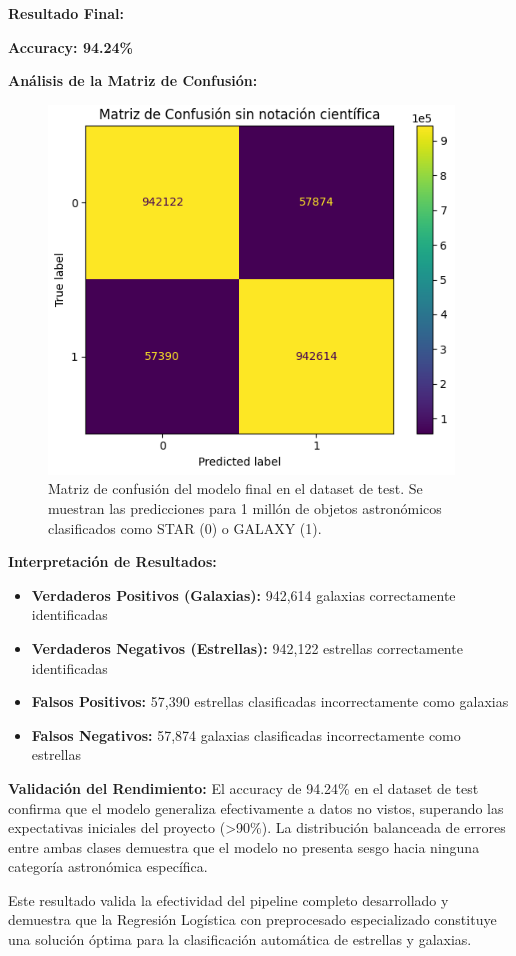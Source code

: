 \documentclass{article}
\begin{document}
\textbf{Resultado Final:}
\begin{center}
\Large \textbf{Accuracy: 94.24\%}
\end{center}

\textbf{Análisis de la Matriz de Confusión:}

\begin{figure}[H]
    \centering
    \includegraphics[width=0.6\linewidth]{matriz_confusion.png}
    \caption{Matriz de confusión del modelo final en el dataset de test. Se muestran las predicciones para 1 millón de objetos astronómicos clasificados como STAR (0) o GALAXY (1).}
    \label{fig:matriz_confusion}
\end{figure}

\textbf{Interpretación de Resultados:}
\begin{itemize}
    \item \textbf{Verdaderos Positivos (Galaxias):} 942,614 galaxias correctamente identificadas
    \item \textbf{Verdaderos Negativos (Estrellas):} 942,122 estrellas correctamente identificadas  
    \item \textbf{Falsos Positivos:} 57,390 estrellas clasificadas incorrectamente como galaxias
    \item \textbf{Falsos Negativos:} 57,874 galaxias clasificadas incorrectamente como estrellas
\end{itemize}

\textbf{Validación del Rendimiento:}
El accuracy de 94.24\% en el dataset de test confirma que el modelo generaliza efectivamente a datos no vistos, superando las expectativas iniciales del proyecto (>90\%). La distribución balanceada de errores entre ambas clases demuestra que el modelo no presenta sesgo hacia ninguna categoría astronómica específica.

Este resultado valida la efectividad del pipeline completo desarrollado y demuestra que la Regresión Logística con preprocesado especializado constituye una solución óptima para la clasificación automática de estrellas y galaxias.
\end{document}
